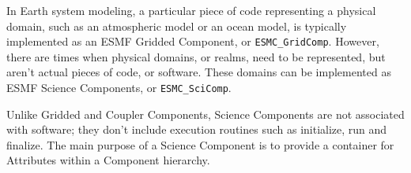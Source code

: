 %

\label{sec:SciComp}

In Earth system modeling, a particular piece of code representing a physical 
domain, such as an atmospheric model or an ocean model, is typically 
implemented as an ESMF Gridded Component, or {\tt ESMC\_GridComp}.  
However, there are times when physical domains, or realms, need to be 
represented, but aren't actual pieces of code, or software.  These domains 
can be implemented as ESMF Science Components, or {\tt ESMC\_SciComp}.

Unlike Gridded and Coupler Components, Science Components are not associated 
with software; they don't include execution routines such as initialize, 
run and finalize.  The main purpose of a Science Component 
is to provide a container for Attributes within a Component hierarchy. 
